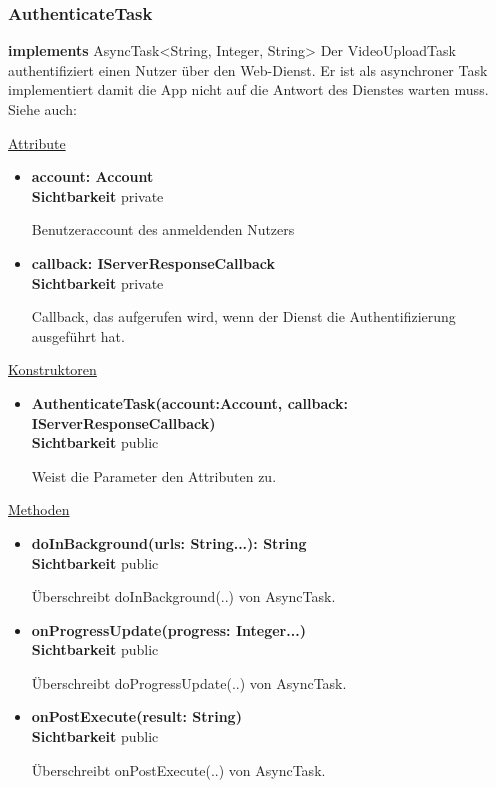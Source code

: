 \subsubsection{AuthenticateTask} \label{app:klasse:AuthenticateTask}
\textbf{implements} AsyncTask<String, Integer, String> \newline
Der VideoUploadTask authentifiziert einen Nutzer über den Web-Dienst. Er ist als asynchroner Task implementiert damit die App nicht auf die Antwort des Dienstes warten muss.\newline
Siehe auch:  \newline

\underline{Attribute}
\begin{itemize}
\itemsep0pt
\item \textbf{account: Account} \hfill\\ 
\textbf{Sichtbarkeit} private

Benutzeraccount des anmeldenden Nutzers

\item \textbf{callback: IServerResponseCallback} \hfill\\ 
\textbf{Sichtbarkeit} private

Callback, das aufgerufen wird, wenn der Dienst die Authentifizierung ausgeführt hat.
\end{itemize}

\underline{Konstruktoren}
\begin{itemize}
\itemsep0pt
\item \textbf{AuthenticateTask(account:Account, callback: IServerResponseCallback)} \hfill\\
\textbf{Sichtbarkeit} public

Weist die Parameter den Attributen zu.
\end{itemize}

\underline{Methoden}
\begin{itemize}
\itemsep0pt
\item \textbf{doInBackground(urls: String...): String}\hfill\\
\textbf{Sichtbarkeit} public

Überschreibt doInBackground(..) von AsyncTask.

\item \textbf{onProgressUpdate(progress: Integer...)}\hfill\\
\textbf{Sichtbarkeit} public

Überschreibt doProgressUpdate(..) von AsyncTask.

\item \textbf{onPostExecute(result: String)}\hfill\\
\textbf{Sichtbarkeit} public

Überschreibt onPostExecute(..) von AsyncTask.
\end{itemize}